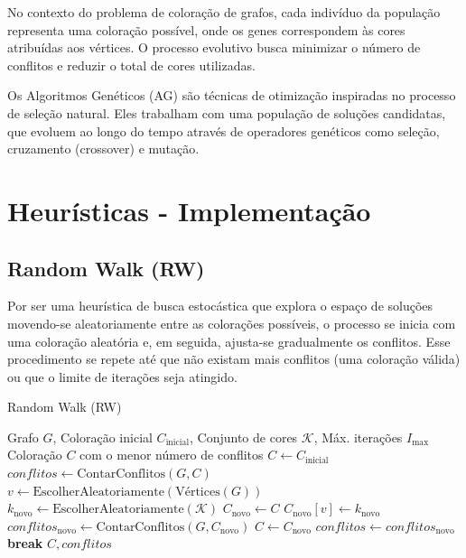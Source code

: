 \documentclass[12pt,a4paper]{article}
\begin{document}
No contexto do problema de coloração de grafos, cada indivíduo da população representa uma coloração possível, onde os genes correspondem às cores atribuídas aos vértices. O processo evolutivo busca minimizar o número de conflitos e reduzir o total de cores utilizadas.

Os Algoritmos Genéticos (AG) são técnicas de otimização inspiradas no processo de seleção natural. Eles trabalham com uma população de soluções candidatas, que evoluem ao longo do tempo através de operadores genéticos como seleção, cruzamento (crossover) e mutação.

\section{Heurísticas - Implementação}

\subsection{Random Walk (RW)}
Por ser uma heurística de busca estocástica que explora o espaço de soluções movendo-se aleatoriamente entre as colorações possíveis, o processo se inicia com uma coloração aleatória e, em seguida, ajusta-se gradualmente os conflitos. Esse procedimento se repete até que não existam mais conflitos (uma coloração válida) ou que o limite de iterações seja atingido.
\begin{algorithm}[H]
\caption{Random Walk (RW)}
\label{alg:random_walk}
\begin{algorithmic}[1]
\Require Grafo \(G\), Coloração inicial \(C_{\text{inicial}}\), Conjunto de cores \(\mathcal{K}\), Máx. iterações \(I_{\max}\)
\Ensure Coloração \(C\) com o menor número de conflitos
\State \(C \gets C_{\text{inicial}}\)
\State \(conflitos \gets \text{ContarConflitos}(G, C)\)
    \State \(v \gets \text{EscolherAleatoriamente}(\text{Vértices}(G))\)
    \State \(k_{\text{novo}} \gets \text{EscolherAleatoriamente}(\mathcal{K})\)
    \State \(C_{\text{novo}} \gets C\)
    \State \(C_{\text{novo}}[v] \gets k_{\text{novo}}\)
    \State \(conflitos_{\text{novo}} \gets \text{ContarConflitos}(G, C_{\text{novo}})\)
        \State \(C \gets C_{\text{novo}}\)
        \State \(conflitos \gets conflitos_{\text{novo}}\)
         \State \textbf{break} \EndIf
    \EndIf
\EndFor
\State \Return \(C, conflitos\)
\end{algorithmic}
\end{algorithm}
\end{document}
